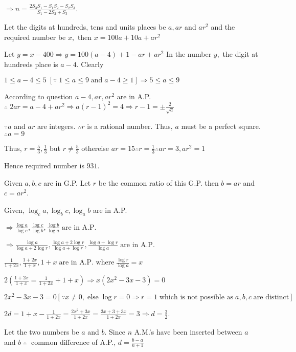   $\Rightarrow n = \frac{2S_3S_1 - S_1S_2 - S_2S_3}{S_1 - 2S_2 + S_3}$.
\item Let the digits at hundreds, tens and units places be $a, ar$ and $ar^2$ and the required number be $x,$ then
  $x = 100a + 10a + ar^2$

  Let $y = x - 400 \Rightarrow y = 100(a - 4) + 1 - ar + ar^2$ In the number $y,$ the digit at hundreds place is $a - 4.$ Clearly

  $1\leq a - 4\leq 5\;[\because\;1\leq a \leq 9 \;\text{and}\;a - 4\geq 1] \Rightarrow 5\leq a\leq 9$

  According to question $a - 4, ar, ar^2$ are in A.P. $\therefore\; 2ar = a - 4 + ar^2\Rightarrow a(r - 1)^2 = 4\Rightarrow r - 1 =
  \pm\frac{2}{\sqrt{a}}$

  $\because a$ and $ar$ are integers. $\therefore r$ is a rational number. Thus, $a$ must be a perfect square. $\therefore a = 9$

  Thus, $r = \frac{5}{3}, \frac{1}{3}$ but $r\neq \frac{5}{3}$ othereise $ar = 15\therefore r = \frac{1}{3}\therefore ar = 3, ar^2
  = 1$

  Hence required number is $931$.
\item Given $a, b, c$ are in G.P. Let $r$ be the common ratio of this G.P. then $b = ar$ and $c = ar^2$.

  Given, $\log_c a, \log_b c, \log_a b$ are in A.P.

  $\Rightarrow \frac{\log a}{\log c}, \frac{\log c}{\log b}, \frac{\log b}{\log a}\;\text{are in A.P.}$

  $\Rightarrow \frac{\log a}{\log a + 2\log r}, \frac{\log a + 2\log r}{\log a + \log r}, \frac{\log a + \log r}{\log a}\;\text{are
    in A.P.}$

  $\frac{1}{1 + 2x}, \frac{1 + 2x}{1 + x}, 1 + x\;\text{are in A.P. where}\;\frac{\log r}{\log a} = x$

  $2\left(\frac{1 + 2x}{1 + x} = \frac{1}{1 + 2x} + 1 + x\right)\Rightarrow x(2x^2 - 3x - 3) = 0$

  $2x^2 - 3x - 3 = 0[\because x\neq 0,\;\text{else}\;\log r = 0 \Rightarrow r = 1\;\text{which is not possible as}\; a, b, c\;\text{are
      distinct}]$

  $2d = 1 + x - \frac{1}{1 + 2x} = \frac{2x^2 + 3x}{1 + 2x} = \frac{3x + 3 + 3x}{1 + 2x} = 3\Rightarrow d =
  \frac{3}{2}$.
\item Let the two numbers be $a$ and $b.$ Since $n$ A.M.'s have been inserted between $a$ and $b\;\therefore\;$ common
  difference of A.P., $d = \frac{b - a}{n + 1}$

